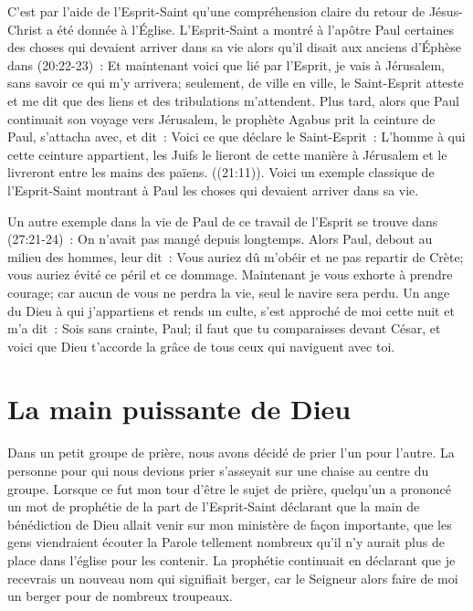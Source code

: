 C'est par l'aide de l'Esprit-Saint qu'une compréhension claire
 du retour de Jésus-Christ a été donnée à l'Église.
 L'Esprit-Saint a montré à l'apôtre Paul certaines des choses
 qui devaient arriver dans sa vie alors qu'il disait aux anciens d'Éphèse
 dans (20:22-23)~:
 \og Et maintenant voici que lié par l'Esprit, je vais à Jérusalem,
 sans savoir ce qui m'y arrivera; seulement, de ville en ville,
 le Saint-Esprit atteste et me dit que des liens
 et des tribulations m'attendent. \fg{}
 Plus tard, alors que Paul continuait son voyage vers Jérusalem,
 le prophète Agabus prit la ceinture de Paul, s'attacha avec, et dit~:
 \og Voici ce que déclare le Saint-Esprit~:
 L'homme à qui cette ceinture appartient, les Juifs le lieront
 de cette manière à Jérusalem et le livreront
 entre les mains des païens. \fg{} ((21:11)).
 Voici un exemple classique de l'Esprit-Saint montrant à Paul
 les choses qui devaient arriver dans sa vie.

Un autre exemple dans la vie de Paul de ce travail de l'Esprit
 se trouve dans (27:21-24)~:
 \og On n'avait pas mangé depuis longtemps.
 Alors Paul, debout au milieu des hommes, leur dit~:
 Vous auriez dû m'obéir et ne pas repartir de Crète;
 vous auriez évité ce péril et ce dommage.
 Maintenant je vous exhorte à prendre courage;
 car aucun de vous ne perdra la vie, seul le navire sera perdu.
 Un ange du Dieu à qui j'appartiens et rends un culte,
 s'est approché de moi cette nuit et m'a dit~:
 Sois sans crainte, Paul; il faut que tu comparaisses devant César,
 et voici que Dieu t'accorde la grâce de tous ceux qui naviguent avec toi. \fg{}

\section*{La main puissante de Dieu}

Dans un petit groupe de prière, nous avons décidé de prier
 l'un pour l'autre.
 La personne pour qui nous devions prier s'asseyait sur une chaise
 au centre du groupe. Lorsque ce fut mon tour d'être le sujet de prière,
 quelqu'un a prononcé un mot de prophétie de la part de l'Esprit-Saint
 déclarant que la main de bénédiction de Dieu allait venir
 sur mon ministère de façon importante, que les gens viendraient écouter
 la Parole tellement nombreux qu'il n'y aurait plus de place dans l'église
 pour les contenir.
 La prophétie continuait en déclarant que je recevrais un nouveau nom
 qui signifiait berger, car le Seigneur alors faire de moi un berger
 pour de nombreux troupeaux.

